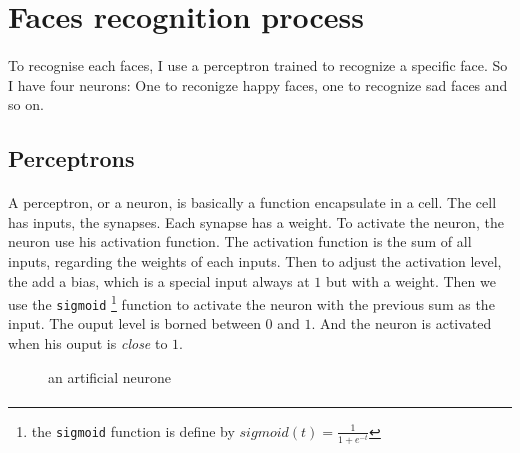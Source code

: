 \section{Faces recognition process}

    \paragraph{}{
        To recognise each faces, I use a perceptron trained to recognize a 
     specific face. So I have four neurons: One to reconigze happy faces, one to
     recognize sad faces and so on.
    }

    \subsection{Perceptrons}

    \paragraph{}{
        A perceptron, or a neuron, is basically a function encapsulate in a 
     cell. The cell has inputs, the synapses. Each synapse has a weight. To
     activate the neuron, the neuron use his activation function. The activation
     function is the sum of all inputs, regarding the weights of each inputs.
     Then to adjust the activation level, the add a bias, which is a special
     input always at $1$ but with a weight. Then we use the \texttt{sigmoid}
     \footnote{ the \texttt{sigmoid} function is define by $sigmoid(t) = 
     \frac{1}{1 + e^{-t}}$} function to activate the neuron with the previous 
     sum as the input. The ouput level is borned between $0$ and $1$. And the
     neuron is activated when his ouput is \textit{close} to $1$.
    }
    
    \begin{figure}[!h]
        \label{fig:neuron}
        \begin{center}
            
        \end{center}
        \caption{an artificial neurone}
    \end{figure}
    
    \paragraph{}{
    
    }

    \paragraph{}{
    }

